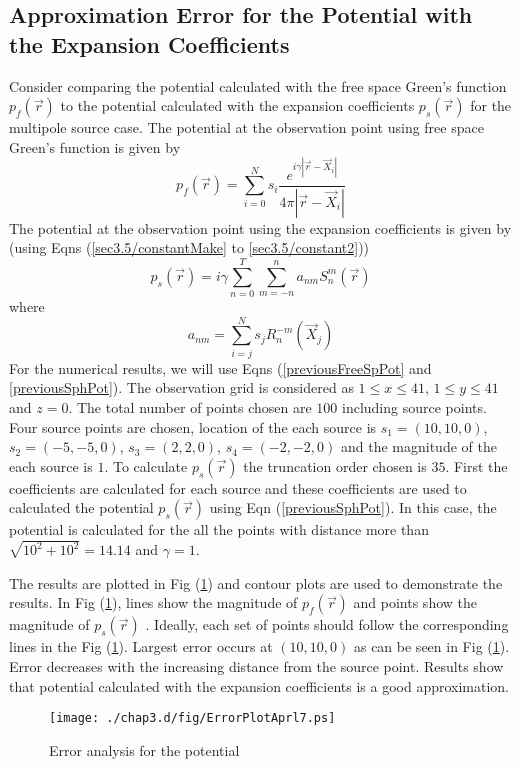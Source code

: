 \subsection{Approximation Error for the Potential with the Expansion Coefficients}
Consider comparing the potential  calculated with the  free space Green's function $p_f(\vec{r})$ to the potential calculated with the expansion coefficients  $p_s(\vec{r})$  for the multipole source case.  The potential at the observation point using  free space Green's function is given by 
\begin{equation}
\label{previousFreeSpPot}
 p_f(\vec{r})=  \sum_{i=0}^{N}s_{i} \frac{e^{i\gamma|\vec{r}-\vec{X}_i|}}{4\pi|\vec{r}-\vec{X}_i|}  
\end{equation}   
The potential at the observation point using the expansion coefficients is given by (using Eqns (\ref{sec3.5/constantMake} to \ref{sec3.5/constant2}))
\begin{equation}
\label{previousSphPot}
  p_s(\vec{r}) =  i\gamma \sum_{n=0}^{T}\sum_{m= -n}^{n}a_{nm} S_{n}^{m}(\vec{r})
 \end{equation}
where   
\begin{equation}
  a_{nm} = \sum_{i=j}^{N}s_{j}R_{n}^{-m}(\vec{X}_j)
 \end{equation}
For the numerical results, we will use  Eqns (\ref{previousFreeSpPot} and \ref{previousSphPot}).  The observation grid is considered as 
 $ 1 \le x \le 41$, $1 \le y \le 41$ and $z = 0$. The total number of points chosen are $100$ including source points. Four source points are chosen, location of the each source is $s_1=(10,10,0)$, $s_2=(-5,-5,0)$, $s_3=(2,2,0)$, $s_4=(-2,-2,0)$ and the magnitude of the each source is $1$. To calculate $p_s(\vec{r})$ the  truncation order chosen is $35$.  First the coefficients are calculated for each source and these coefficients are used to calculated the potential $ p_s(\vec{r})$  using Eqn (\ref{previousSphPot}).  In this case, the potential is calculated for the all the points with distance more than $\sqrt{10^2+10^2}=14.14$ and  $\gamma=1$. 
\par
The results are plotted in Fig (\ref{cntrparam1Aprl7}) and  contour plots are used to  demonstrate the  results. In  Fig (\ref{cntrparam1Aprl7}), lines show the magnitude of $p_f(\vec{r})$  and points show the magnitude of $p_s(\vec{r})$ . Ideally, each set of points should follow the corresponding lines in the Fig (\ref{cntrparam1Aprl7}). Largest error occurs at $(10,10,0)$ as can be seen in Fig (\ref{cntrparam1Aprl7}). Error decreases with the increasing distance from the source point. Results show that potential calculated with the expansion coefficients is a good approximation.





\begin{figure}[h!]
\begin{center}
\texttt{[image: ./chap3.d/fig/ErrorPlotAprl7.ps]}
\caption{ Error analysis for  the potential} 
\label{cntrparam1Aprl7}
\end{center}
\end{figure}